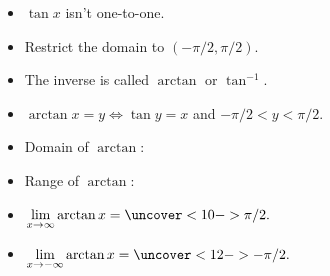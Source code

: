 \begin{frame}
\begin{columns}[c]
\ %
%
%
\begin{itemize}
\item<1->  $\tan x$ isn't one-to-one.
\item<2->  Restrict the domain to $(-\pi /2, \pi /2)$.
\item<3->  The inverse is called $\arctan$ or $\tan^{-1}$.
\item<4->  $\arctan x = y \Leftrightarrow \tan y = x$ and $-\pi /2 < y < \pi /2$.
\item<5->  \alert<handout:0| 5-6>{Domain of $\arctan$: }
\item<5->  \alert<handout:0| 7-8>{Range of $\arctan$: }
\item<9->  \alert<handout:0| 9-10>{$\displaystyle \lim_{x\rightarrow \infty} \arctan x = \uncover<10->{\pi / 2.}$}
\item<9->  \alert<handout:0| 11-12>{$\displaystyle \lim_{x\rightarrow - \infty} \arctan x = \uncover<12->{- \pi / 2.}$}
\end{itemize}
\end{columns}
\end{frame}
